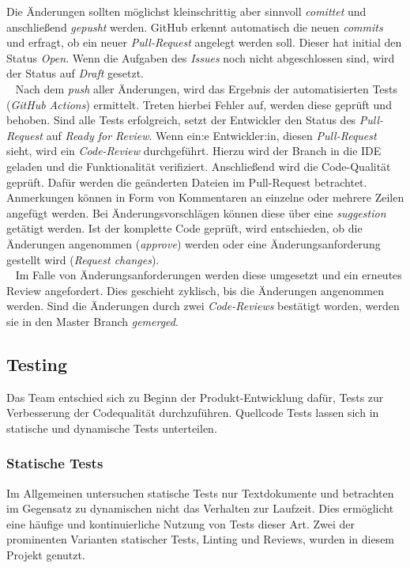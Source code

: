 \documentclass[10pt, a4paper]{article}
\begin{document}
\begin{onehalfspace}
    Die Änderungen sollten möglichst kleinschrittig aber sinnvoll \textit{comittet} und anschließend \textit{gepusht} werden.
    GitHub erkennt automatisch die neuen \textit{commits} und erfragt, ob ein neuer \textit{Pull-Request} angelegt werden soll.
    Dieser hat initial den Status \textit{Open}.
    Wenn die Aufgaben des \textit{Issues} noch nicht abgeschlossen sind, wird der Status auf \textit{Draft} gesetzt.
    \\~
    Nach dem \textit{push} aller Änderungen, wird das Ergebnis der automatisierten Tests (\textit{GitHub Actions}) ermittelt. Treten hierbei Fehler auf,
    werden diese geprüft und behoben. Sind alle Tests erfolgreich, setzt der Entwickler den Status des \textit{Pull-Request} auf \textit{Ready for Review}.
    Wenn ein:e Entwickler:in, diesen \textit{Pull-Request} sieht, wird ein \textit{Code-Review} durchgeführt.
    Hierzu wird der Branch in die IDE geladen und die Funktionalität verifiziert. Anschließend wird die Code-Qualität geprüft.
    Dafür werden die geänderten Dateien im Pull-Request betrachtet. Anmerkungen können in Form
    von Kommentaren an einzelne oder mehrere Zeilen angefügt werden. Bei Änderungsvorschlägen können diese über eine \textit{suggestion}
    getätigt werden. Ist der komplette Code geprüft, wird entschieden,
    ob die Änderungen angenommen (\textit{approve}) werden oder eine Änderungsanforderung gestellt wird (\textit{Request changes}).
    \\~
    Im Falle von Änderungsanforderungen werden diese umgesetzt und ein erneutes Review angefordert. Dies geschieht zyklisch, bis die Änderungen angenommen werden.
    Sind die Änderungen durch zwei \textit{Code-Reviews} bestätigt worden, werden sie in den Master Branch \textit{gemerged}.

  \subsection{Testing}
  Das Team entschied sich zu Beginn der Produkt-Entwicklung dafür, Tests zur Verbesserung der Codequalität durchzuführen.
  Quellcode Tests lassen sich in statische und dynamische Tests unterteilen.

  \subsubsection*{Statische Tests}
    Im Allgemeinen untersuchen statische Tests nur Textdokumente und betrachten im Gegensatz zu dynamischen nicht das Verhalten zur Laufzeit.
    Dies ermöglicht eine häufige und kontinuierliche Nutzung von Tests dieser Art.
    Zwei der prominenten Varianten statischer Tests, Linting und Reviews, wurden in diesem Projekt genutzt.


\end{onehalfspace}
\end{document}
